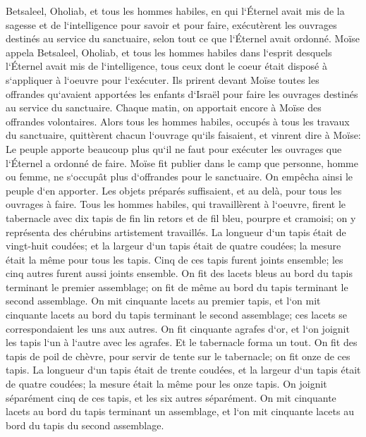 \verse Betsaleel, Oholiab, et tous les hommes habiles, en qui l`Éternel avait mis de la sagesse et de l`intelligence pour savoir et pour faire, exécutèrent les ouvrages destinés au service du sanctuaire, selon tout ce que l`Éternel avait ordonné. 
\verse Moïse appela Betsaleel, Oholiab, et tous les hommes habiles dans l`esprit desquels l`Éternel avait mis de l`intelligence, tous ceux dont le coeur était disposé à s`appliquer à l`oeuvre pour l`exécuter. 
\verse Ils prirent devant Moïse toutes les offrandes qu`avaient apportées les enfants d`Israël pour faire les ouvrages destinés au service du sanctuaire. Chaque matin, on apportait encore à Moïse des offrandes volontaires. 
\verse Alors tous les hommes habiles, occupés à tous les travaux du sanctuaire, quittèrent chacun l`ouvrage qu`ils faisaient, 
\verse et vinrent dire à Moïse: Le peuple apporte beaucoup plus qu`il ne faut pour exécuter les ouvrages que l`Éternel a ordonné de faire. 
\verse Moïse fit publier dans le camp que personne, homme ou femme, ne s`occupât plus d`offrandes pour le sanctuaire. On empêcha ainsi le peuple d`en apporter. 
\verse Les objets préparés suffisaient, et au delà, pour tous les ouvrages à faire. 
\verse Tous les hommes habiles, qui travaillèrent à l`oeuvre, firent le tabernacle avec dix tapis de fin lin retors et de fil bleu, pourpre et cramoisi; on y représenta des chérubins artistement travaillés. 
\verse La longueur d`un tapis était de vingt-huit coudées; et la largeur d`un tapis était de quatre coudées; la mesure était la même pour tous les tapis. 
\verse Cinq de ces tapis furent joints ensemble; les cinq autres furent aussi joints ensemble. 
\verse On fit des lacets bleus au bord du tapis terminant le premier assemblage; on fit de même au bord du tapis terminant le second assemblage. 
\verse On mit cinquante lacets au premier tapis, et l`on mit cinquante lacets au bord du tapis terminant le second assemblage; ces lacets se correspondaient les uns aux autres. 
\verse On fit cinquante agrafes d`or, et l`on joignit les tapis l`un à l`autre avec les agrafes. Et le tabernacle forma un tout. 
\verse On fit des tapis de poil de chèvre, pour servir de tente sur le tabernacle; on fit onze de ces tapis. 
\verse La longueur d`un tapis était de trente coudées, et la largeur d`un tapis était de quatre coudées; la mesure était la même pour les onze tapis. 
\verse On joignit séparément cinq de ces tapis, et les six autres séparément. 
\verse On mit cinquante lacets au bord du tapis terminant un assemblage, et l`on mit cinquante lacets au bord du tapis du second assemblage. 
